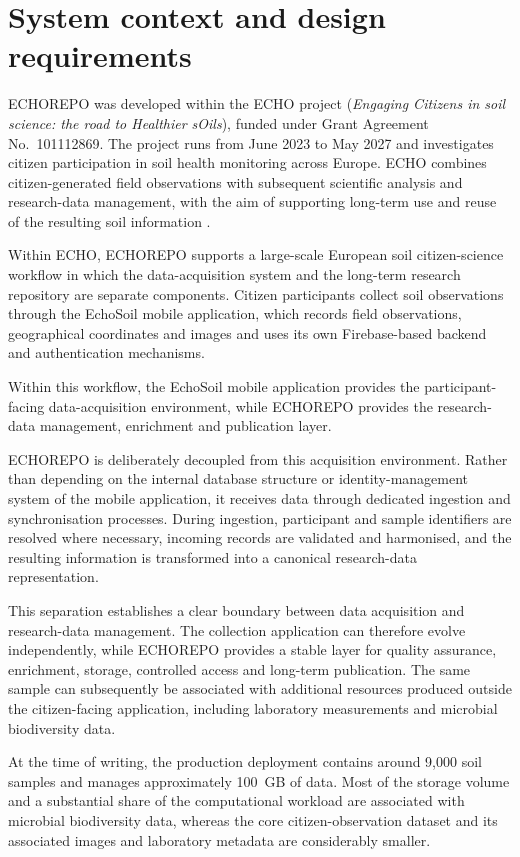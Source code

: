 \section{System context and design requirements}

ECHOREPO was developed within the ECHO project
(\emph{Engaging Citizens in soil science: the road to Healthier sOils}),
funded under Grant Agreement No.~101112869. The project runs from
June 2023 to May 2027 and investigates citizen participation in soil
health monitoring across Europe. ECHO combines citizen-generated field
observations with subsequent scientific analysis and research-data
management, with the aim of supporting long-term use and reuse of the
resulting soil information \parencite{echo2023project}.

Within ECHO, ECHOREPO supports a large-scale European soil
citizen-science workflow in which the data-acquisition system and the
long-term research repository are separate components. Citizen
participants collect soil observations through the EchoSoil mobile
application, which records field observations, geographical coordinates
and images and uses its own Firebase-based backend and authentication
mechanisms.

Within this workflow, the EchoSoil mobile application provides the
participant-facing data-acquisition environment, while ECHOREPO provides
the research-data management, enrichment and publication layer.

ECHOREPO is deliberately decoupled from this acquisition environment. Rather than depending on the internal database structure or identity-management system of the mobile application, it receives data through dedicated ingestion and synchronisation processes. During ingestion, participant and sample identifiers are resolved where necessary, incoming records are validated and harmonised, and the resulting information is transformed into a canonical research-data representation.

This separation establishes a clear boundary between data acquisition and research-data management. The collection application can therefore evolve independently, while ECHOREPO provides a stable layer for quality assurance, enrichment, storage, controlled access and long-term publication. The same sample can subsequently be associated with additional resources produced outside the citizen-facing application, including laboratory measurements and microbial biodiversity data.

At the time of writing, the production deployment contains around 9,000 soil samples and manages approximately 100~GB of data. Most of the storage volume and a substantial share of the computational workload are associated with microbial biodiversity data, whereas the core citizen-observation dataset and its associated images and laboratory metadata are considerably smaller.

